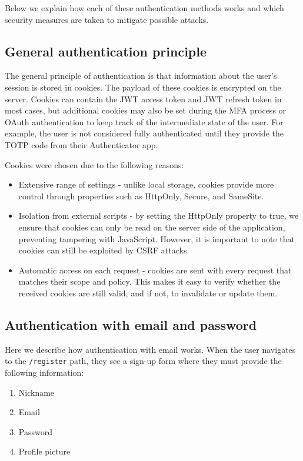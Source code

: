 Below we explain how each of these authentication methods works and which security measures
are taken to mitigate possible attacks.

\subsection*{General authentication principle}

The general principle of authentication is that information about the user’s session is stored in cookies.
The payload of these cookies is encrypted on the server.  \cite{Sarkar2020OAuth}
Cookies can contain the JWT access token and JWT refresh token in most cases, but additional cookies may also be set during the MFA process or OAuth authentication to keep track of the intermediate state of the user.
For example, the user is not considered fully authenticated until they provide the TOTP code from
their Authenticator app.

Cookies were chosen due to the following reasons:
\begin{itemize}
  \item Extensive range of settings - unlike local storage, cookies provide more control through properties such as HttpOnly, Secure, and SameSite.
  \item Isolation from external scripts - by setting the HttpOnly property to true, we ensure that
    cookies can only be read on the server side of the application, preventing tampering with JavaScript. However, it is important to note that cookies can still be exploited by CSRF attacks.
  \item Automatic access on each request - cookies are sent with every request that matches their scope and policy. This makes it easy to verify whether the received cookies are still valid, and if not, to invalidate or update them.
\end{itemize}

\subsection*{Authentication with email and password}

Here we describe how authentication with email works. When the user navigates to the
\texttt{/register} path, they see a sign-up form where they must provide the following information:

\begin{enumerate}
  \item Nickname
  \item Email
  \item Password
  \item Profile picture
\end{enumerate}

